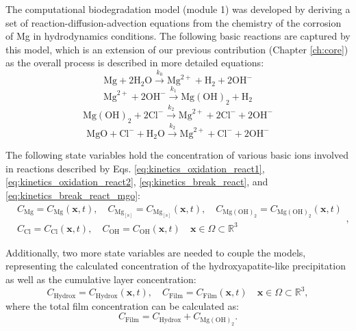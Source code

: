 The computational biodegradation model (module 1) was developed by deriving a set of reaction-diffusion-advection equations from the chemistry of the corrosion of Mg in hydrodynamics conditions. The following basic reactions are captured by this model, which is an extension of our previous contribution \cite{Barzegari2021} (Chapter \ref{ch:core}) as the overall process is described in more detailed equations:
\begin{equation} \label{eq:kinetics_oxidation_react1}
\mathrm{Mg}+2 \mathrm{H}_{2} \mathrm{O} \stackrel{k_{0}}{\rightarrow} \mathrm{Mg}^{2+}+\mathrm{H}_{2}+2 \mathrm{OH}^{-}
\end{equation}
\begin{equation} \label{eq:kinetics_oxidation_react2}
\mathrm{Mg}^{2+}+2 \mathrm{OH}^{-} \stackrel{k_{1}}{\rightarrow} \mathrm{Mg}(\mathrm{OH})_{2}+\mathrm{H}_{2}
\end{equation}
\begin{equation} \label{eq:kinetics_break_react}
\mathrm{Mg}(\mathrm{OH})_{2}+2 \mathrm{Cl}^{-} \stackrel{k_{2}}{\rightarrow} \mathrm{Mg}^{2+}+2 \mathrm{Cl}^{-}+2 \mathrm{OH}^{-}
\end{equation}
\begin{equation} \label{eq:kinetics_break_react_mgo}
\mathrm{MgO}+ \mathrm{Cl}^{-} + \mathrm{H}_{2} \mathrm{O} \stackrel{k_{2}}{\rightarrow} \mathrm{Mg}^{2+}+ \mathrm{Cl}^{-}+ 2\mathrm{OH}^{-}
\end{equation}

The following state variables hold the concentration of various basic ions involved in reactions described by Eqs. \ref{eq:kinetics_oxidation_react1}, \ref{eq:kinetics_oxidation_react2}, \ref{eq:kinetics_break_react}, and \ref{eq:kinetics_break_react_mgo}:
\begin{equation} \label{eq:kinetics_state_vars_film}
\begin{aligned}
&C_{\mathrm{Mg}} = C_{\mathrm{Mg}}(\mathbf{x},t), \quad C_{\mathrm{Mg}_\mathrm{[s]}} = C_{\mathrm{Mg}_\mathrm{[s]}}(\mathbf{x},t), \quad C_{\mathrm{Mg}(\mathrm{OH})_{2}} = C_{\mathrm{Mg}(\mathrm{OH})_{2}}(\mathbf{x},t)  \\
&C_{\mathrm{Cl}} = C_{\mathrm{Cl}}(\mathbf{x},t), \quad C_{\mathrm{OH}} = C_{\mathrm{OH}}(\mathbf{x},t) \quad \mathbf{x} \in \Omega \subset \mathbb{R}^{3}
\end{aligned},
\end{equation}

Additionally, two more state variables are needed to couple the models, representing the calculated concentration of the hydroxyapatite-like precipitation as well as the cumulative layer concentration:
\begin{equation} \label{eq:kinetics_state_vars}
C_{\mathrm{Hydrox}} = C_{\mathrm{Hydrox}}(\mathbf{x},t), \quad C_{\mathrm{Film}} = C_{\mathrm{Film}}(\mathbf{x},t) \quad \mathbf{x} \in \Omega \subset \mathbb{R}^{3},
\end{equation}
where the total film concentration can be calculated as:
\begin{equation} \label{eq:kinetics_film_cumulative}
C_{\mathrm{Film}} = C_{\mathrm{Hydrox}} + C_{\mathrm{\mathrm{Mg}(\mathrm{OH})_{2}}}.
\end{equation}

